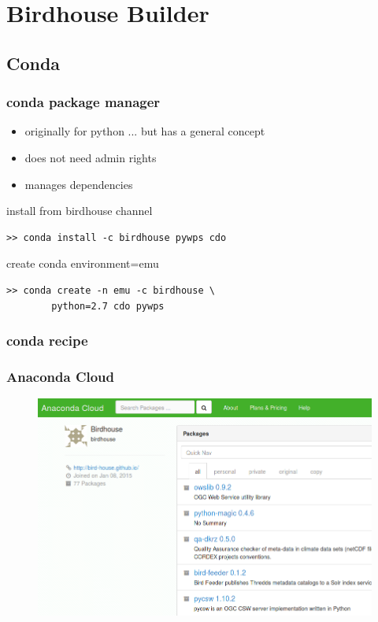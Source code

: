 \documentclass{beamer}
\begin{document}

  \section{Birdhouse Builder}
  \subsection{Conda}


  \begin{frame}[fragile]
    \frametitle{conda package manager}
    \begin{itemize}
      \item originally for python ... but has a general concept
      \item does not need admin rights
      \item manages dependencies
    \end{itemize}
    \begin{block}{install from birdhouse channel}
      \begin{verbatim}
>> conda install -c birdhouse pywps cdo 
      \end{verbatim}
    \end{block}
    \begin{block}{create conda environment=emu}
      \begin{verbatim}
>> conda create -n emu -c birdhouse \
        python=2.7 cdo pywps 
      \end{verbatim}
    \end{block}
\end{frame}


  \begin{frame}
    \frametitle{conda recipe}
    
\end{frame}


  \begin{frame}[plain]
    \frametitle{Anaconda Cloud}
    \begin{figure}
      \includegraphics[width=11.5cm]{images/anaconda-cloud.png}
    \end{figure}
  \end{frame}
\end{document}
